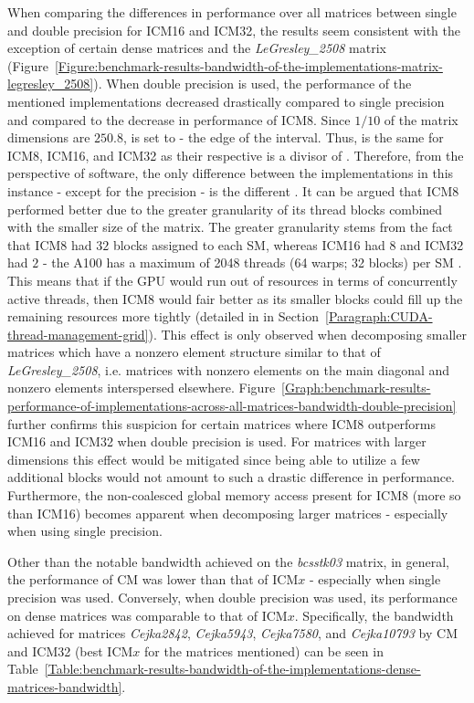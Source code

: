 When comparing the differences in performance over all matrices between single and double precision for ICM16 and ICM32, the results seem consistent with the exception of certain dense matrices and the \textit{LeGresley\_2508} matrix (Figure~\ref{Figure:benchmark-results-bandwidth-of-the-implementations-matrix-legresley_2508}). When double precision is used, the performance of the mentioned implementations decreased drastically compared to single precision and compared to the decrease in performance of ICM8. Since $ 1/10 $ of the matrix dimensions are $ 250.8 $,  is set to  - the edge of the interval. Thus,  is the same for ICM8, ICM16, and ICM32 as their respective  is a divisor of . Therefore, from the perspective of software, the only difference between the implementations in this instance - except for the precision - is the different . It can be argued that ICM8 performed better due to the greater granularity of its thread blocks combined with the smaller size of the matrix. The greater granularity stems from the fact that ICM8 had $ 32 $ blocks assigned to each SM, whereas ICM16 had $ 8 $ and ICM32 had $ 2 $ - the A100 has a maximum of 2048 threads (64 warps; 32 blocks) per SM \cite{soj8qSRbfefUdi8Y}. This means that if the GPU would run out of resources in terms of concurrently active threads, then ICM8 would fair better as its smaller blocks could fill up the remaining resources more tightly (detailed in \textit{} in Section~\ref{Paragraph:CUDA-thread-management-grid}). This effect is only observed when decomposing smaller matrices which have a nonzero element structure similar to that of \textit{LeGresley\_2508}, i.e. matrices with nonzero elements on the main diagonal and nonzero elements interspersed elsewhere. Figure~\ref{Graph:benchmark-results-performance-of-implementations-across-all-matrices-bandwidth-double-precision} further confirms this suspicion for certain matrices where ICM8 outperforms ICM16 and ICM32 when double precision is used. For matrices with larger dimensions this effect would be mitigated since being able to utilize a few additional blocks would not amount to such a drastic difference in performance. Furthermore, the non-coalesced global memory access present for ICM8 (more so than ICM16) becomes apparent when decomposing larger matrices - especially when using single precision.
\par Other than the notable bandwidth achieved on the \textit{bcsstk03} matrix, in general, the performance of CM was lower than that of ICM$ x $ - especially when single precision was used. Conversely, when double precision was used, its performance on dense matrices was comparable to that of ICM$ x $. Specifically, the bandwidth achieved for matrices \textit{Cejka2842}, \textit{Cejka5943}, \textit{Cejka7580}, and \textit{Cejka10793} by CM and ICM32 (best ICM$ x $ for the matrices mentioned) can be seen in Table~\ref{Table:benchmark-results-bandwidth-of-the-implementations-dense-matrices-bandwidth}.

